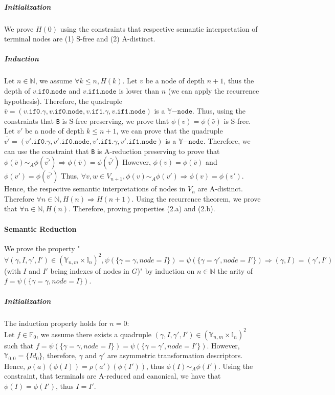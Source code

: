 \documentclass[a4paper,10pt]{article}
\newcommand{\N}{\mathbb{N}}%
\newcommand{\F}{\mathbb{F}}
\newcommand{\Y}{\mathbb{Y}}
\newcommand{\I}{\mathbb{I}}
\newcommand{\Ynode}{\Y\mathtt{-node}}
\newcommand{\fieldNode}{\texttt{node}}
\newcommand{\fieldGamma}{\mathtt{\gamma}}
\newcommand{\fieldThen}{\mathtt{if1}}
\newcommand{\fieldElse}{\mathtt{if0}}
\begin{document}
\subparagraph{Initialization}
We prove $H(0)$ using the constraints that respective semantic interpretation of terminal nodes are (1) S-free and (2) A-distinct.

\subparagraph{Induction}
Let $n\in\N$, we assume $\forall k\leq n, H(k)$.
Let $v$ be a node of depth $n+1$, thus the depth of $v.\fieldElse{}.\fieldNode{}$ and $v.\fieldThen{}.\fieldNode{}$ is lower than $n$ (we can apply the recurrence hypothesis).
Therefore, the quadruple $\bar{v} = (v.\fieldElse{}.\fieldGamma{}, v.\fieldElse{}.\fieldNode{}, v.\fieldThen{}.\fieldGamma{}, v.\fieldThen{}.\fieldNode{})$ is a $\Ynode$.
Thus, using the constraints that \texttt{B} is S-free preserving, we prove that $\phi(v) = \phi(\bar{v})$ is S-free.
Let $v'$ be a node of depth $k\leq n+1$, we can prove that the quadruple $\bar{v'} = (v'.\fieldElse{}.\fieldGamma{}, v'.\fieldElse{}.\fieldNode{}, v'.\fieldThen{}.\fieldGamma{}, v'.\fieldThen{}.\fieldNode{})$ is a $\Ynode$.
Therefore, we can use the constraint that \texttt{B} is A-reduction preserving to prove that $\phi(\bar{v}) \sim_A \phi(\bar{v'}) \Rightarrow \phi(\bar{v}) = \phi(\bar{v'})$
However, $\phi(v) = \phi(\bar{v})$ and $\phi(v') = \phi(\bar{v'})$
Thus, $\forall v, w \in V_{n+1}, \phi(v) \sim_A \phi(v') \Rightarrow \phi(v) = \phi(v')$.
Hence, the respective semantic interpretations of nodes in $V_n$ are A-distinct.
Therefore $\forall n\in\N, H(n) \Rightarrow H(n+1)$.
Using the recurrence theorem, we prove that $\forall n\in\N, H(n)$.
Therefore, proving properties (2.a) and (2.b).

\paragraph{Semantic Reduction}
We prove the property "$\forall (\gamma, I, \gamma', I') \in (\Y_{n, m} \times \I_n)^2, \psi(\{\gamma = \gamma, node = I\}) = \psi(\{\gamma = \gamma', node = I'\}) \Rightarrow (\gamma, I) = (\gamma', I')$ (with $I$ and $I'$ being indexes of nodes in $G$)" by induction on $n\in\N$ the arity of $f = \psi(\{\gamma = \gamma, node = I\})$.

\subparagraph{Initialization}
The induction property holds for $n = 0$: \\
Let $f\in\F_0$, we assume there exists a quadruple $(\gamma, I, \gamma', I') \in (\Y_{n, m} \times \I_n)^2$ such that $f = \psi(\{\gamma = \gamma, node = I\}) = \psi(\{\gamma = \gamma', node = I'\})$.
However, $\Y_{0, 0} = \{Id_0\}$, therefore, $\gamma$ and $\gamma'$ are asymmetric transformation descriptors.
Hence, $\rho(a)(\phi(I)) = \rho(a')(\phi(I'))$, thus $\phi(I) \sim_A \phi(I')$.
Using the constraint, that terminals are A-reduced and canonical, we have that $\phi(I) = \phi(I')$, thus $I = I'$.
\end{document}
